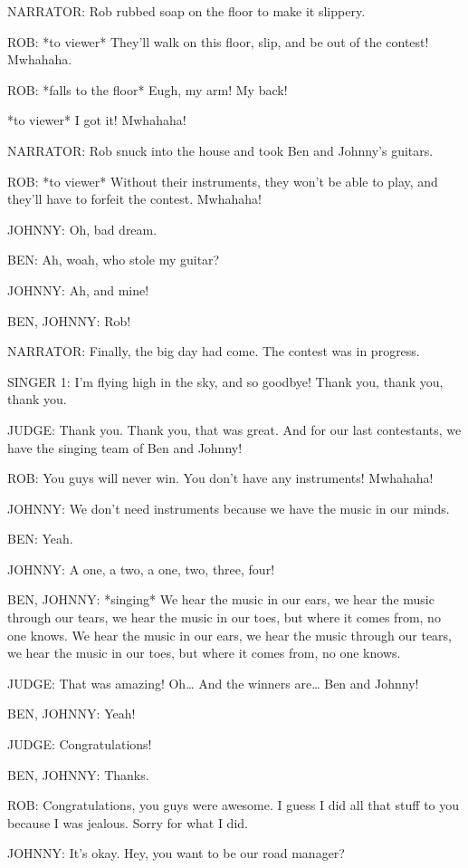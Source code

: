 NARRATOR:
Rob rubbed soap on the floor to make it slippery.

ROB:
*to viewer* They'll walk on this floor, slip, and be out of the contest!
Mwhahaha.

ROB:
*falls to the floor*
Eugh, my arm!
My back!

*to viewer*
I got it!
Mwhahaha!

NARRATOR:
Rob snuck into the house and took Ben and Johnny's guitars.

ROB:
*to viewer*
Without their instruments, they won't be able to play, and they'll have to forfeit the contest.
Mwhahaha!

JOHNNY:
Oh, bad dream.

BEN:
Ah, woah, who stole my guitar?

JOHNNY:
Ah, and mine!

BEN, JOHNNY:
Rob!

NARRATOR:
Finally, the big day had come.
The contest was in progress.

SINGER 1:
I'm flying high in the sky, and so goodbye!
Thank you, thank you, thank you.

JUDGE:
Thank you.
Thank you, that was great.
And for our last contestants, we have the singing team of Ben and Johnny!

ROB:
You guys will never win.
You don't have any instruments!
Mwhahaha!

JOHNNY:
We don't need instruments because we have the music in our minds.

BEN:
Yeah.

JOHNNY:
A one, a two, a one, two, three, four!

BEN, JOHNNY:
*singing*
We hear the music in our ears, we hear the music through our tears, we hear the music in our toes, but where it comes from, no one knows.
We hear the music in our ears, we hear the music through our tears, we hear the music in our toes, but where it comes from, no one knows.

JUDGE:
That was amazing!
Oh\dots
And the winners are\dots
Ben and Johnny!

BEN, JOHNNY:
Yeah!

JUDGE:
Congratulations!

BEN, JOHNNY:
Thanks.

ROB:
Congratulations, you guys were awesome.
I guess I did all that stuff to you because I was jealous.
Sorry for what I did.

JOHNNY:
It's okay.
Hey, you want to be our road manager?

